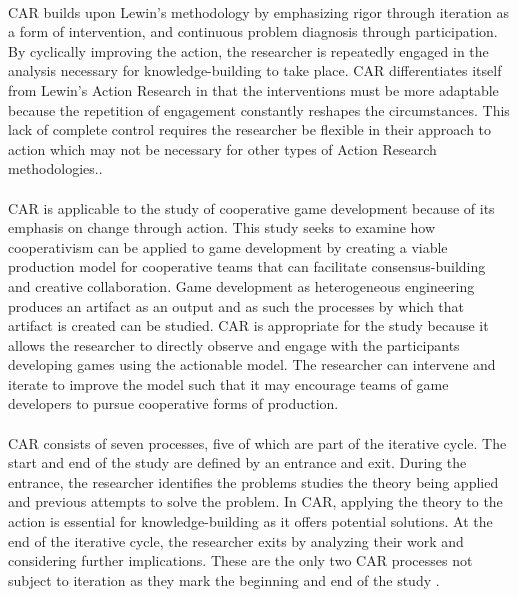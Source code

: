 \paragraph{} CAR builds upon Lewin's methodology by emphasizing rigor through iteration as a form of intervention, and continuous problem diagnosis through participation. By cyclically improving the action, the researcher is repeatedly engaged in the analysis necessary for knowledge-building to take place. CAR differentiates itself from Lewin's Action Research in that the interventions must be more adaptable because the repetition of engagement constantly reshapes the circumstances. This lack of complete control requires the researcher be flexible in their approach to action which may not be necessary for other types of Action Research methodologies.\autocite{davison_principles_2004}.

\paragraph{} CAR is applicable to the study of cooperative game development because of its emphasis on change through action. This study seeks to examine how cooperativism can be applied to game development by creating a viable production model for cooperative teams that can facilitate consensus-building and creative collaboration. Game development as heterogeneous engineering produces an artifact as an output and as such the processes by which that artifact is created can be studied. CAR is appropriate for the study because it allows the researcher to directly observe and engage with the participants developing games using the actionable model. The researcher can intervene and iterate to improve the model such that it may encourage teams of game developers to pursue cooperative forms of production.

\paragraph{} CAR consists of seven processes, five of which are part of the iterative cycle. The start and end of the study are defined by an entrance and exit. During the entrance, the researcher identifies the problems studies the theory being applied and previous attempts to solve the problem. In CAR, applying the theory to the action is essential for knowledge-building as it offers potential solutions. At the end of the iterative cycle, the researcher exits by analyzing their work and considering further implications. These are the only two CAR processes not subject to iteration as they mark the beginning and end of the study \autocite{davison_principles_2004}.


